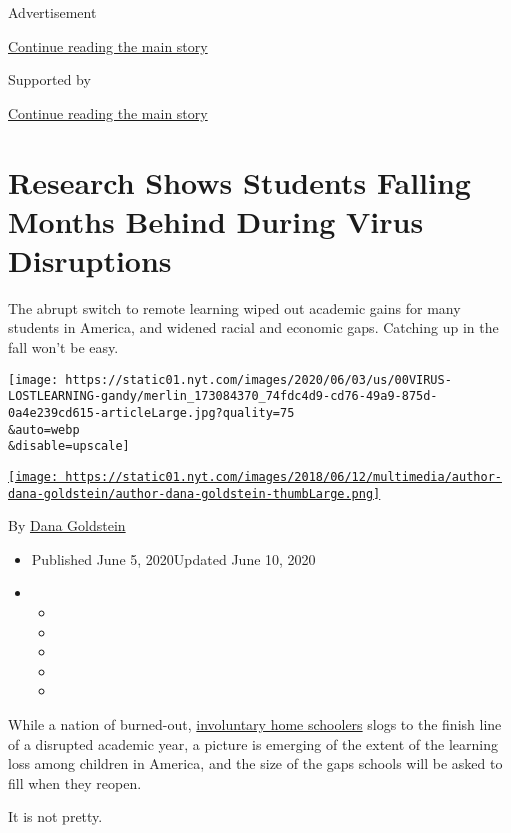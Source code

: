 Advertisement

\protect\hyperlink{after-top}{Continue reading the main story}

Supported by

\protect\hyperlink{after-sponsor}{Continue reading the main story}

\hypertarget{research-shows-students-falling-months-behind-during-virus-disruptions}{%
\section{Research Shows Students Falling Months Behind During Virus
Disruptions}\label{research-shows-students-falling-months-behind-during-virus-disruptions}}

The abrupt switch to remote learning wiped out academic gains for many
students in America, and widened racial and economic gaps. Catching up
in the fall won't be easy.

\texttt{[image: https://static01.nyt.com/images/2020/06/03/us/00VIRUS-LOSTLEARNING-gandy/merlin\_173084370\_74fdc4d9-cd76-49a9-875d-0a4e239cd615-articleLarge.jpg?quality=75\\\&auto=webp\\\&disable=upscale]}

\href{https://www.nytimes.com/by/dana-goldstein}{\texttt{[image: https://static01.nyt.com/images/2018/06/12/multimedia/author-dana-goldstein/author-dana-goldstein-thumbLarge.png]}}

By \href{https://www.nytimes.com/by/dana-goldstein}{Dana Goldstein}

\begin{itemize}
\item
  Published June 5, 2020Updated June 10, 2020
\item
  \begin{itemize}
  \item
  \item
  \item
  \item
  \item
  \end{itemize}
\end{itemize}

While a nation of burned-out,
\href{https://www.nytimes.com/2020/04/06/us/coronavirus-schools-attendance-absent.html}{involuntary
home schoolers} slogs to the finish line of a disrupted academic year, a
picture is emerging of the extent of the learning loss among children in
America, and the size of the gaps schools will be asked to fill when
they reopen.

It is not pretty.

